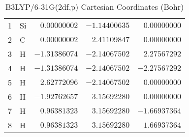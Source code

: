 \documentclass[10pt,oneside]{article}
\begin{document}
\begin{table}[h]
\centering
\caption{B3LYP/6-31G(2df,p) Cartesian Coordinates (Bohr)}
\begin{tabular}{llrrr}
\toprule
1  & Si & $ 0.00000002$ & $-1.14400635$ & $ 0.00000000$ \\
2  & C  & $ 0.00000002$ & $ 2.41109847$ & $ 0.00000000$ \\
3  & H  & $-1.31386074$ & $-2.14067502$ & $ 2.27567292$ \\
4  & H  & $-1.31386074$ & $-2.14067502$ & $-2.27567292$ \\
5  & H  & $ 2.62772096$ & $-2.14067502$ & $ 0.00000000$ \\
6  & H  & $-1.92762657$ & $ 3.15692280$ & $ 0.00000000$ \\
7  & H  & $ 0.96381323$ & $ 3.15692280$ & $-1.66937364$ \\
8  & H  & $ 0.96381323$ & $ 3.15692280$ & $ 1.66937364$ \\
\bottomrule
\end{tabular}
\end{table}
\end{document}
